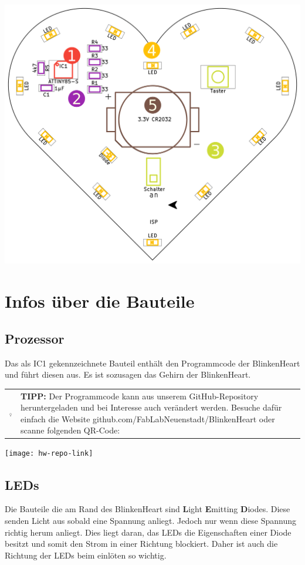 \documentclass[a4paper,10pt]{article}
\newcommand{\hintbox}[1]{
\begin{center}
	\begin{tabularx}{\linewidth}{
			>{\columncolor{hintbackground}}c
			>{\columncolor{hintbackground}}X}
		\raisebox{\dimexpr2\baselineskip-\height/2-\tabcolsep}
		{\includegraphics[width=1cm]{icons/002-technology}}&
		\raisebox{\tabcolsep}{\strut}\textbf{TIPP:} #1\raisebox{-\tabcolsep}{\strut}
	\end{tabularx}
\end{center}
}
\begin{document}
\begin{center}
	\includegraphics{pcb/solder_order}
\end{center}

\newpage
\section{Infos über die Bauteile}
\subsection{Prozessor}
Das als IC1 gekennzeichnete Bauteil enthält den Programmcode der BlinkenHeart und führt diesen aus. Es ist sozusagen das Gehirn der BlinkenHeart.

\hintbox{Der Programmcode kann aus unserem GitHub-Repository heruntergeladen und bei Interesse auch verändert werden. Besuche dafür einfach die Website github.com/FabLabNeuenstadt/BlinkenHeart oder scanne folgenden QR-Code:}
\begin{center}
	\texttt{[image: hw-repo-link]}
\end{center}

\subsection{LEDs}
Die Bauteile die am Rand des BlinkenHeart sind
\textbf{L}ight \textbf{E}mitting \textbf{D}iodes.
Diese senden Licht aus sobald eine Spannung anliegt.
Jedoch nur wenn diese Spannung richtig herum anliegt.
Dies liegt daran, das LEDs die Eigenschaften einer Diode besitzt und
somit den Strom in einer Richtung blockiert.
Daher ist auch die Richtung der LEDs beim einlöten so wichtig.
\end{document}
